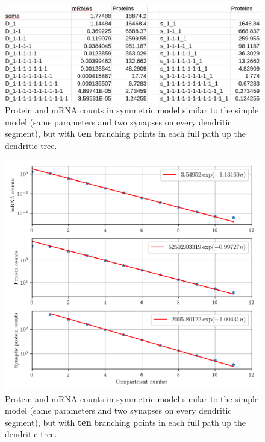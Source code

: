 \documentclass[a4paper, 11pt]{article}
\begin{document}
\begin{figure}
  \begin{center}
    \includegraphics[width=12cm]{img/10_forks_combined.png}
  \end{center}  
  \caption{Protein and mRNA counts in symmetric model similar to the simple model (same parameters and two synapses on every dendritic segment), but with {\bf ten} branching points in each full path up the dendritic tree.}
  \label{fig:10_forks_combined}
\end{figure}

\begin{figure}
  \begin{center}
    \includegraphics[width=12cm]{img/10_forks_decay_plots.png}
  \end{center}  
  \caption{Protein and mRNA counts in symmetric model similar to the simple model (same parameters and two synapses on every dendritic segment), but with {\bf ten} branching points in each full path up the dendritic tree.}
  \label{10_forks_decay_plots}
\end{figure}
\end{document}
